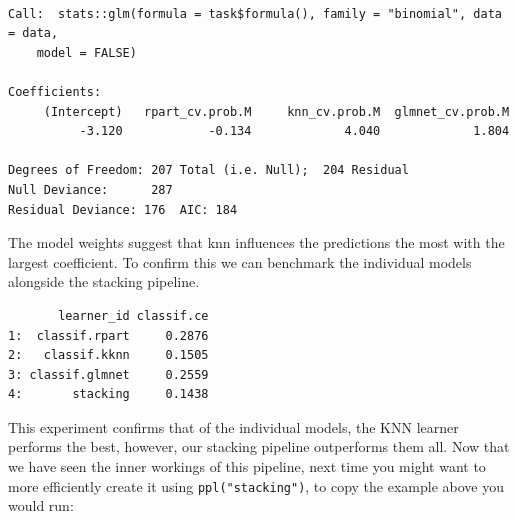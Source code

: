 \begin{verbatim}

Call:  stats::glm(formula = task$formula(), family = "binomial", data = data, 
    model = FALSE)

Coefficients:
     (Intercept)   rpart_cv.prob.M     knn_cv.prob.M  glmnet_cv.prob.M  
          -3.120            -0.134             4.040             1.804  

Degrees of Freedom: 207 Total (i.e. Null);  204 Residual
Null Deviance:      287 
Residual Deviance: 176  AIC: 184
\end{verbatim}

The model weights suggest that knn influences the predictions the most
with the largest coefficient. To confirm this we can benchmark the
individual models alongside the stacking pipeline.

\begin{Shaded}
\begin{Highlighting}[]
\SpecialCharTok{$}\OtherTok{=} 
\OtherTok{=} \NormalTok{(}\NormalTok{(}\NormalTok{),}
  \NormalTok{(}\NormalTok{))}
\OtherTok{=} 
\SpecialCharTok{$}
\end{Highlighting}
\end{Shaded}

\begin{verbatim}
       learner_id classif.ce
1:  classif.rpart     0.2876
2:   classif.kknn     0.1505
3: classif.glmnet     0.2559
4:       stacking     0.1438
\end{verbatim}

This experiment confirms that of the individual models, the KNN learner
performs the best, however, our stacking pipeline outperforms them all.
Now that we have seen the inner workings of this pipeline, next time you
might want to more efficiently create it using \texttt{ppl("stacking")},
to copy the example above you would run:

\begin{Shaded}
\begin{Highlighting}[]
\NormalTok{(}\NormalTok{,}
   \NormalTok{(}\NormalTok{(}\NormalTok{, }\NormalTok{,}
    \NormalTok{)),}
   \NormalTok{(}\NormalTok{)}
\NormalTok{)}
\end{Highlighting}
\end{Shaded}

